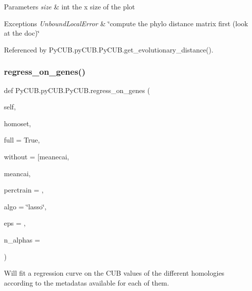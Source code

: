 \begin{DoxyParams}{Parameters}
{\em size} & int the x size of the plot\\
\hline
\end{DoxyParams}

\begin{DoxyExceptions}{Exceptions}
{\em Unbound\+Local\+Error} & \char`\"{}compute the phylo distance matrix first (look at the doc)\char`\"{} \\
\hline
\end{DoxyExceptions}


Referenced by Py\+C\+U\+B.\+py\+C\+U\+B.\+Py\+C\+U\+B.\+get\+\_\+evolutionary\+\_\+distance().

\mbox{\label{class_py_c_u_b_1_1py_c_u_b_1_1_py_c_u_b_a1b65efe7deb4ba5f65203c8be6fc7af2}} 
\subsubsection{\texorpdfstring{regress\+\_\+on\+\_\+genes()}{regress\_on\_genes()}}
{\footnotesize\ttfamily def Py\+C\+U\+B.\+py\+C\+U\+B.\+Py\+C\+U\+B.\+regress\+\_\+on\+\_\+genes (\begin{DoxyParamCaption}\item[{}]{self,  }\item[{}]{homoset,  }\item[{}]{full = {\ttfamily True},  }\item[{}]{without = {\ttfamily \mbox{[}\textquotesingle{}meanecai\textquotesingle{}},  }\item[{}]{meancai,  }\item[{}]{perctrain = {},  }\item[{}]{algo = {\ttfamily \char`\"{}lasso\char`\"{}},  }\item[{}]{eps = {},  }\item[{}]{n\+\_\+alphas = {} }\end{DoxyParamCaption})}



Will fit a regression curve on the C\+UB values of the different homologies according to the metadatas available for each of them. 

